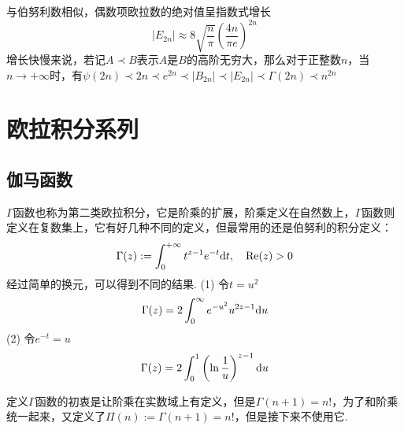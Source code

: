 \documentclass[UTF8]{ctexart}
\newcommand{\trm}[1]{{\rm #1}}
\begin{document}
与伯努利数相似，偶数项欧拉数的绝对值呈指数式增长
\[ |E_{2 n}| \approx 8 \sqrt { \frac{n}{\pi} } \left(\frac{4 n}{ \pi e}\right)^{2 n}\]
增长快慢来说，若记\(A \prec B\)表示\(A\)是\(B\)的高阶无穷大，那么对于正整数\(n\)，当\(n \to +\infty\)时，有\(\psi(2n) \prec 2n \prec e^{2n} \prec |B_{2n}| \prec |E_{2n}| \prec \Gamma(2n) \prec n^{2n}\)

\section{欧拉积分系列}

\subsection{伽马函数}

\(\Gamma\)函数也称为第二类欧拉积分，它是阶乘的扩展，阶乘定义在自然数上，\(\Gamma\)函数则定义在复数集上，它有好几种不同的定义，但最常用的还是伯努利的积分定义：
\[ \Gamma(z) := \int_0^{+\infty} t^{z-1} e^{-t} \trm{d}t, \quad \trm{Re}(z) > 0 \]
经过简单的换元，可以得到不同的结果.
\newline
(1) 令\(t=u^2\)
\[ \Gamma(z) = 2\int_{0}^{\infty}e^{-u^2}u^{2z-1}\trm{d}u\]
(2) 令\(e^{-t}=u\)
\[ \Gamma(z) = 2\int_{0}^{1}\left(\ln\frac{1}{u}\right)^{z-1}\trm{d}u\]

定义\(\Gamma\)函数的初衷是让阶乘在实数域上有定义，但是\(\Gamma(n+1)=n!\)，为了和阶乘统一起来，又定义了\(\Pi(n):=\Gamma(n+1)=n!\)，但是接下来不使用它.
\end{document}
